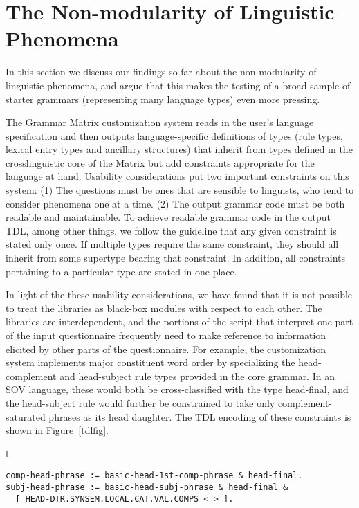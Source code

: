 \documentclass[11pt]{article}
\begin{document}
\section{The Non-modularity of Linguistic Phenomena}

In this section we discuss our findings so far about the
non-modularity of linguistic phenomena, and argue that this
makes the testing of a broad sample of starter grammars (representing
many language types) even more pressing.

The Grammar Matrix customization system reads in the user's language
specification and then outputs language-specific definitions of types
(rule types, lexical entry types and ancillary structures) that
inherit from types defined in the crosslinguistic core of the Matrix
but add constraints appropriate for the language at hand. 
Usability considerations put two important constraints on this system:
(1) The questions must be ones that are sensible to linguists,
who tend to consider phenomena one at a time.  
(2) The output grammar code must be both readable and maintainable.
To achieve readable grammar code in the output TDL, among other
things, we follow the guideline that any given constraint is
stated only once.  If multiple types require the same constraint, they
should all inherit from some supertype bearing that constraint.
In addition, all constraints pertaining to a particular type are
stated in one place.

In light of the these usability considerations, we
have found that it is not possible to treat the libraries as black-box
modules with respect to each other.  The libraries are interdependent,
and the portions of the script that interpret one part of the input
questionnaire frequently need to make reference to information
elicited by other parts of the questionnaire.  For example, the
customization system implements major constituent word order by
specializing the head-complement and head-subject rule types provided
in the core grammar.  In an SOV language, these would both be
cross-classified with the type head-final, and the head-subject rule
would further be constrained to take only complement-saturated phrases
as its head daughter.  The TDL encoding of these constraints is shown
in Figure~\ref{tdlfig}.

\begin{figure*}[ht]
\small
\begin{center}
\begin{tabular}{l}
\begin{minipage}{5in}
\begin{verbatim}
comp-head-phrase := basic-head-1st-comp-phrase & head-final.
subj-head-phrase := basic-head-subj-phrase & head-final &
  [ HEAD-DTR.SYNSEM.LOCAL.CAT.VAL.COMPS < > ].
\end{verbatim}
\end{minipage}\\
\end{tabular}
\end{center}
\caption{Specialized phrase structure rule types for SOV language}
\label{tdlfig}
\end{figure*}
\end{document}
